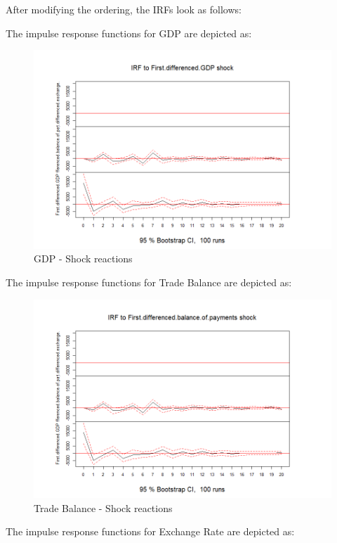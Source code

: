 \documentclass[
]{article}
\begin{document}
After modifying the ordering, the IRFs look as follows:

The impulse response functions for GDP are depicted as:

\begin{figure}

{\centering \includegraphics[width=0.8\linewidth]{../results/IRF_plots2/IRF_to_First.differenced.GDP} 

}

\caption{GDP - Shock reactions}\label{fig:unnamed-chunk-27}
\end{figure}

The impulse response functions for Trade Balance are depicted as:

\begin{figure}

{\centering \includegraphics[width=0.8\linewidth]{../results/IRF_plots2/IRF_to_First.differenced.balance.of.payments} 

}

\caption{Trade Balance - Shock reactions}\label{fig:unnamed-chunk-28}
\end{figure}

The impulse response functions for Exchange Rate are depicted as:
\end{document}
